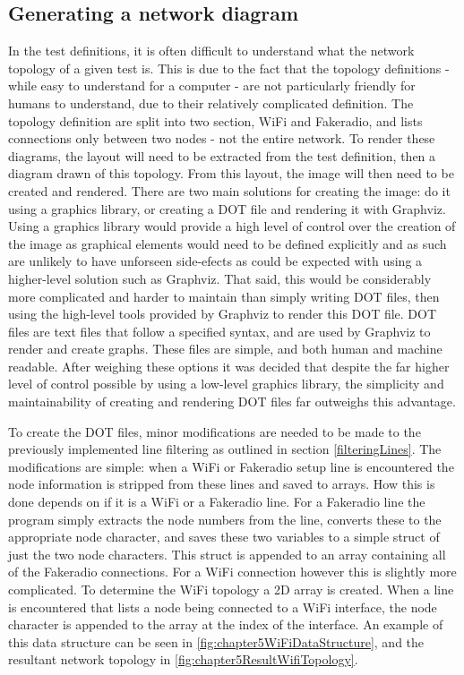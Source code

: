 \subsection{Generating a network diagram}
In the test definitions, it is often difficult to understand what the network topology of a given test is.
This is due to the fact that the topology definitions - while easy to understand for a computer - are not particularly friendly for humans to understand, due to their relatively complicated definition.
The topology definition are split into two section, WiFi and Fakeradio, and lists connections only between two nodes - not the entire network.
To render these diagrams, the layout will need to be extracted from the test definition, then a diagram drawn of this topology.
From this layout, the image will then need to be created and rendered.
There are two main solutions for creating the image: do it using a graphics library, or creating a DOT file and rendering it with Graphviz.
Using a graphics library would provide a high level of control over the creation of the image as graphical elements would need to be defined explicitly and as such are unlikely to have unforseen side-efects as could be expected with using a higher-level solution such as Graphviz.
That said, this would be considerably more complicated and harder to maintain than simply writing DOT files, then using the high-level tools provided by Graphviz to render this DOT file.
DOT files are text files that follow a specified syntax, and are used by Graphviz to render and create graphs.
These files are simple, and both human and machine readable. 
After weighing these options it was decided that despite the far higher level of control possible by using a low-level graphics library, the simplicity and maintainability of creating and rendering DOT files far outweighs this advantage.

To create the DOT files, minor modifications are needed to be made to the previously implemented line filtering as outlined in section \ref{filteringLines}.
The modifications are simple: when a WiFi or Fakeradio setup line is encountered the node information is stripped from these lines and saved to arrays.
How this is done depends on if it is a WiFi or a Fakeradio line.
For a Fakeradio line the program simply extracts the node numbers  from the line, converts these to the appropriate node character, and saves these two variables to a simple struct of just the two node characters.
This struct is appended to an array containing all of the Fakeradio connections.
For a WiFi connection however this is slightly more complicated.
To determine the WiFi topology a 2D array is created.
When a line is encountered that lists a node being connected to a WiFi interface, the node character is appended to the array at the index of the interface.
An example of this data structure can be seen in \figurename{ \ref{fig:chapter5WiFiDataStructure}}, and the resultant network topology in \figurename{ \ref{fig:chapter5ResultWifiTopology}}.

